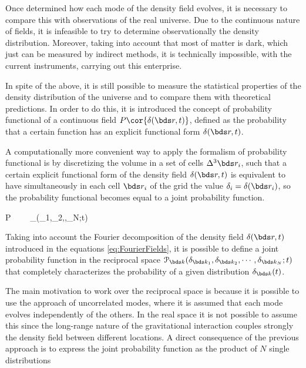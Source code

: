 Once determined how each mode of the density field evolves, it is necessary
to compare this with observations of the real universe. Due to the 
continuous nature of fields, it is infeasible to try to determine 
observationally the density distribution. Moreover, taking into account 
that most of matter is dark, which just can be measured by indirect methods, 
it is technically impossible, with the current instruments, carrying out 
this enterprise.


In spite of the above, it is still possible to measure the statistical 
properties of the density distribution of the universe and to compare them
with theoretical predictions. In order to do this, it is introduced the 
concept of probability functional of a continuous field 
$P\cor{ \delta(\bds r,t) }$, defined as the probability that a certain 
function has an explicit functional form $\delta(\bds r,t)$.


A computationally more convenient way to apply the formalism of probability
functional is by discretizing the volume in a set of cells $\Delta^3 \bds 
r_i$, such that a certain explicit functional form of the density field
$\delta(\bds r,t)$ is equivalent to have simultaneously in each cell 
$\bds r_i$ of the grid the value $\delta_i = \delta(\bds r_i)$, so the 
probability functional becomes equal to a joint probability function.



{ P \ \ \longrightarrow \ \ 
_{}(\delta_1,\delta_2,\cdots,\delta_N;t)  }


Taking into account the Fourier decomposition of the density field 
$\delta(\bds r,t)$ introduced in the equations \ref{eq:FourierFields}, it
is possible to define a joint probability function in the reciprocal space
$\mathcal{P}_{\bds k}(\delta_{\bds k_1},\delta_{\bds k_2}, \cdots,
\delta_{\bds k_N};t)$ that completely characterizes the probability of a 
given distribution $\delta_{\bds k}(t)$.


The main motivation to work over the reciprocal space is because it is 
possible to use the approach of uncorrelated modes, where it is assumed 
that each mode evolves independently of the others. In the real space it
is not possible to assume this since the long-range nature of the 
gravitational interaction couples strongly the density field between 
different locations. A direct consequence of the previous approach is to 
express the joint probability function as the product of $N$ single 
distributions \cite{padmanabhan1995}


